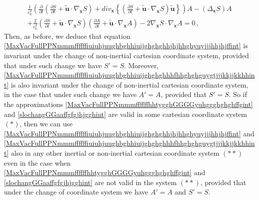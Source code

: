 \documentclass{article}
\theoremstyle{definition}
\theoremstyle{remark}
\renewcommand{\vec}[1]{\mathbf{#1}}
\newcommand{\er}{\eqref}
\newcommand{\er}{\eqref}
\begin{document}
%
%
%
\begin{multline}\label{MaxVacFullPPNmmmffffffiuiuhjuughbghhiuijghghghhhfhhghghguygtjjjkkjjkkhhint}
\frac{1}{c^2_0}\left(\frac{\partial}{\partial t}\left(\frac{\partial
S}{\partial t}+\vec {\tilde u}\cdot\nabla_{\vec x}S\right)+div_{\vec
x} \left\{\left(\frac{\partial S}{\partial t}+\vec {\tilde
u}\cdot\nabla_{\vec x} S\right)\vec {\tilde
u}\right\}\right)A-\left(\Delta_{\vec x}S\right)A
\\+\frac{2}{c^2_0}\left(\frac{\partial S}{\partial
t}+\vec {\tilde u}\cdot\nabla_{\vec x}S\right)\left(\frac{\partial
A}{\partial t}+\vec {\tilde u}\cdot\nabla_{\vec x}A\right)
-2\nabla_{\vec x}S\cdot\nabla_{\vec x}A=0\,,
\end{multline}
Then, as before, we deduce that equation
\er{MaxVacFullPPNmmmffffffiuiuhjuughbghhiuijghghghhjhjhhghyuyjjjhhjhjffint}
is invariant under the change of non-inertial cartesian coordinate
system, provided that under such change we have $S'=S$. Moreover,
\er{MaxVacFullPPNmmmffffffiuiuhjuughbghhiuijghghghhhfhhghghguygtjjjkkjjkkhhint}
is also invariant under the change of non-inertial cartesian
coordinate system, in the case that under such change we have
$A'=A$, provided that $S'=S$. So if the approximations
\er{MaxVacFullPPNmmmffffffhhtygghGGGGyuhggghghghffgint} and
\er{slochangGGaaffgfgjhjgghint} are valid in some cartesian
coordinate system $(*)$, then we can use
\er{MaxVacFullPPNmmmffffffiuiuhjuughbghhiuijghghghhjhjhhghyuyjjjhhjhjffint}
and
\er{MaxVacFullPPNmmmffffffiuiuhjuughbghhiuijghghghhhfhhghghguygtjjjkkjjkkhhint}
also in any other inertial or non-inertial cartesian coordinate
system $(**)$ even in the case when
\er{MaxVacFullPPNmmmffffffhhtygghGGGGyuhggghghghffgint} and
\er{slochangGGaaffgfgjhjgghint} are not valid in the system $(**)$,
provided that under the change of coordinate system we have $A'=A$
and $S'=S$.
\end{document}
